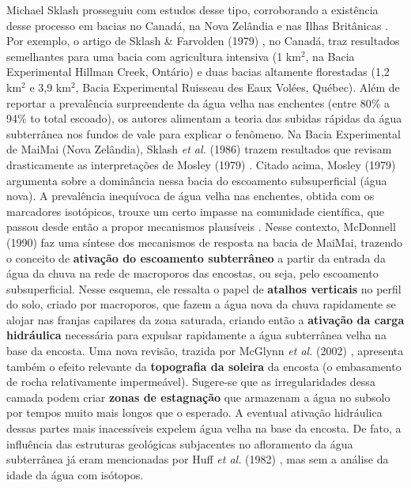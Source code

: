 \documentclass[./main.tex]{subfiles}
\begin{document}
\noindent Michael Sklash prosseguiu com estudos desse tipo, corroborando a existência desse processo em bacias no Canadá, na Nova Zelândia e nas Ilhas Britânicas \cite{sklash1979, sklash1986, sklash1996}. Por exemplo, o artigo de Sklash \& Farvolden (1979) \cite{sklash1979}, no Canadá, traz resultados semelhantes para uma bacia com agricultura intensiva (1 km$^2$, na Bacia Experimental Hillman Creek, Ontário) e duas bacias altamente florestadas (1,2 km$^2$ e 3,9 km$^2$, Bacia Experimental Ruisseau des Eaux Volées, Québec). Além de reportar a prevalência surpreendente da água velha nas enchentes (entre 80\% a 94\% to total escoado), os autores alimentam a teoria das subidas rápidas da água subterrânea nos fundos de vale para explicar o fenômeno. Na Bacia Experimental de MaiMai (Nova Zelândia), Sklash \textit{et al.} (1986) \cite{sklash1986} trazem resultados que revisam drasticamente as interpretações de Mosley (1979) \cite{Mosley1979}. Citado acima, Mosley (1979) argumenta sobre a dominância nessa bacia do escoamento subsuperficial (água nova). A prevalência inequívoca de água velha nas enchentes, obtida com os marcadores isotópicos, trouxe um certo impasse na comunidade científica, que passou desde então a propor mecanismos plausíveis \cite{buttle1994}. Nesse contexto, McDonnell (1990) \cite{mcdonnell1990} faz uma síntese dos mecanismos de resposta na bacia de MaiMai, trazendo o conceito de \textbf{ativação do escoamento subterrâneo} a partir da entrada da água da chuva na rede de macroporos das encostas, ou seja, pelo escoamento subsuperficial. Nesse esquema, ele ressalta o papel de \textbf{atalhos verticais} no perfil do solo, criado por macroporos, que fazem a água nova da chuva rapidamente se alojar nas franjas capilares da zona saturada, criando então a \textbf{ativação da carga hidráulica} necessária para expulsar rapidamente a água subterrânea velha na base da encosta. Uma nova revisão, trazida por McGlynn \textit{et al.} (2002) \cite{mcglynn2002}, apresenta também o efeito relevante da \textbf{topografia da soleira} da encosta (o embasamento de rocha relativamente impermeável). Sugere-se que as irregularidades dessa camada podem criar \textbf{zonas de estagnação} que armazenam a água no subsolo por tempos muito mais longos que o esperado. A eventual ativação hidráulica dessas partes mais inacessíveis expelem água velha na base da encosta. De fato, a influência das estruturas geológicas subjacentes no afloramento da água subterrânea já eram mencionadas por Huff \textit{et al.} (1982) \cite{Huff1982}, mas sem a análise da idade da água com isótopos.
\end{document}

